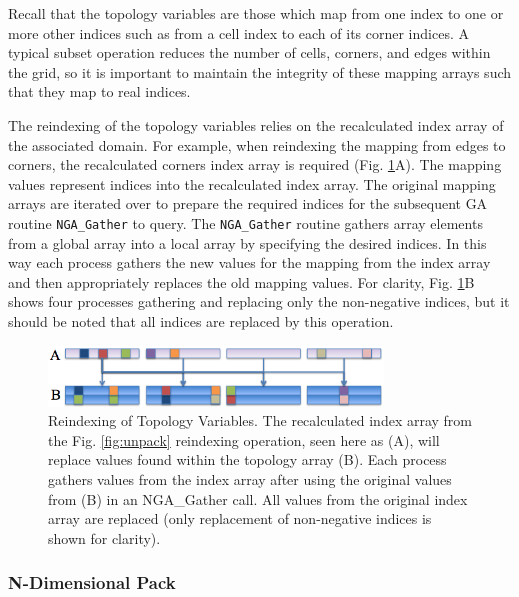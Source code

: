 Recall that the topology variables are those which map from one index to one
or more other indices such as from a cell index to each of its corner indices.
A typical subset operation reduces the number of cells, corners, and edges
within the grid, so it is important to maintain the integrity of these mapping
arrays such that they map to real indices.

The reindexing of the topology variables relies on the recalculated index
array of the associated domain.  For example, when reindexing the mapping from
edges to corners, the recalculated corners index array is required (Fig.
\ref{fig:reindex}A).  The mapping values represent indices into the
recalculated index array.  The original mapping arrays are iterated over to
prepare the required indices for the subsequent GA routine \verb=NGA_Gather=
to query.  The \verb=NGA_Gather= routine gathers array elements from a global
array into a local array by specifying the desired indices.  In this way each
process gathers the new values for the mapping from the index array and then
appropriately replaces the old mapping values.  For clarity, Fig.
\ref{fig:reindex}B shows four processes gathering and replacing only the
non-negative indices, but it should be noted that all indices are replaced by
this operation.

\begin{figure}[!t]
\center
\includegraphics[width=3.5in]{images/reindex2}
\caption{Reindexing of Topology Variables.  The recalculated index array from
the Fig. \ref{fig:unpack} reindexing operation, seen here as (A), will replace
values found within the topology array (B).  Each process gathers values from
the index array after using the original values from (B) in an NGA\_Gather
call.  All values from the original index array are replaced (only replacement
of non-negative indices is shown for clarity).}
\label{fig:reindex}
\end{figure}

\subsubsection{N-Dimensional Pack}
\label{section:alg_pack}

